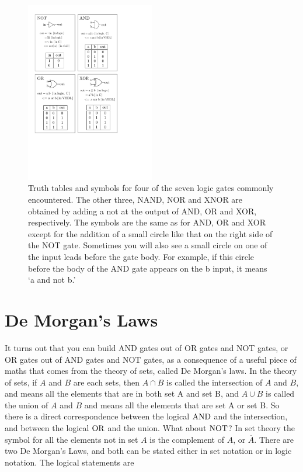 \documentclass[../physical_computing.tex]{subfiles}
\begin{document}
\begin{figure}[t]
\centering
\includegraphics[width=0.5\textwidth]{figures/logic_gates_figure.pdf}
\caption{\label{fig:logic_gates_figure} Truth tables and symbols for four of the seven logic gates commonly encountered. The other three, NAND, NOR and XNOR are obtained by adding a not at the output of AND, OR and XOR, respectively. The symbols are the same as for AND, OR and XOR except for the addition of a small circle like that on the right side of the NOT gate. Sometimes you will also see a small circle on one of the input leads before the gate body. For example, if this circle before the body of the AND gate appears on the b input, it means `a and not b.'}
\end{figure}

\section{De Morgan's Laws}
\label{sec:demorgan}

It turns out that you can build AND gates out of OR gates and NOT gates, or OR gates out of AND gates and NOT gates, as a consequence of a useful piece of maths that comes from the theory of sets, called De Morgan's laws. In the theory of sets, if $A$ and $B$ are each sets, then $A\cap B$ is called the intersection of $A$ and $B$, and means all the elements that are in both set A and set B, and $A\cup B$ is called the union of $A$ and $B$ and means all the elements that are set A or set B. So there is a direct correspondence between the logical $\rm AND$ and the intersection, and between the logical $\rm OR$ and the union. What about $\rm NOT$? In set theory the symbol for all the elements not in set $A$ is the complement of $A$, or $\overline{A}$. There are two De Morgan's Laws, and both can be stated either in set notation or in logic notation. The logical statements are
\end{document}
